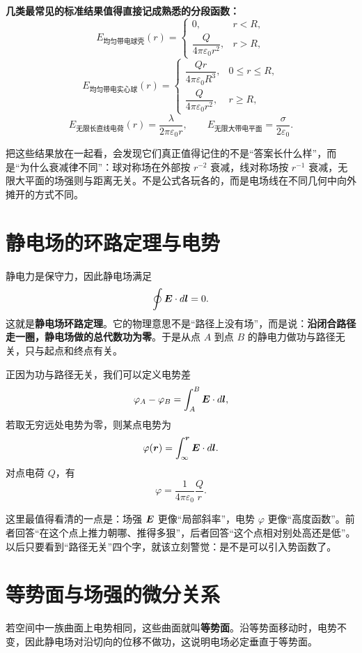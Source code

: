 \documentclass[lang=cn,11pt]{elegantbook}
\newcommand{\bridge}[1]{\begin{note}#1\end{note}}
\begin{document}
\begin{remark}
\textbf{几类最常见的标准结果值得直接记成熟悉的分段函数：}
\[
E_{\text{均匀带电球壳}}(r)=
\begin{cases}
0, & r<R,\\[4pt]
\dfrac{Q}{4\pi\varepsilon_0 r^2}, & r>R,
\end{cases}
\]
\[
E_{\text{均匀带电实心球}}(r)=
\begin{cases}
\dfrac{Qr}{4\pi\varepsilon_0 R^3}, & 0\le r\le R,\\[4pt]
\dfrac{Q}{4\pi\varepsilon_0 r^2}, & r\ge R,
\end{cases}
\]
\[
E_{\text{无限长直线电荷}}(r)=\frac{\lambda}{2\pi\varepsilon_0 r},
\qquad
E_{\text{无限大带电平面}}=\frac{\sigma}{2\varepsilon_0}.
\]
\end{remark}

\bridge{把这些结果放在一起看，会发现它们真正值得记住的不是“答案长什么样”，而是“为什么衰减律不同”：球对称场在外部按 \(r^{-2}\) 衰减，线对称场按 \(r^{-1}\) 衰减，无限大平面的场强则与距离无关。不是公式各玩各的，而是电场线在不同几何中向外摊开的方式不同。}

\section{静电场的环路定理与电势}

静电力是保守力，因此静电场满足
\[
\oint \vb*{E}\cdot d\vb*{l}=0.
\]
这就是\textbf{静电场环路定理}。它的物理意思不是“路径上没有场”，而是说：\textbf{沿闭合路径走一圈，静电场做的总代数功为零}。于是从点 \(A\) 到点 \(B\) 的静电力做功与路径无关，只与起点和终点有关。

正因为功与路径无关，我们可以定义电势差
\[
\varphi_A-\varphi_B
=\int_A^B \vb*{E}\cdot d\vb*{l},
\]
若取无穷远处电势为零，则某点电势为
\[
\varphi(\vb*{r})=\int_{\infty}^{\vb*{r}} \vb*{E}\cdot d\vb*{l}.
\]
对点电荷 \(Q\)，有
\[
\varphi=\frac{1}{4\pi\varepsilon_0}\frac{Q}{r}.
\]

\bridge{这里最值得看清的一点是：场强 \(\vb*{E}\) 更像“局部斜率”，电势 \(\varphi\) 更像“高度函数”。前者回答“在这个点上推力朝哪、推得多狠”，后者回答“这个点相对别处高还是低”。以后只要看到“路径无关”四个字，就该立刻警觉：是不是可以引入势函数了。}

\section{等势面与场强的微分关系}

若空间中一族曲面上电势相同，这些曲面就叫\textbf{等势面}。沿等势面移动时，电势不变，因此静电场对沿切向的位移不做功，这说明电场必定垂直于等势面。
\end{document}
